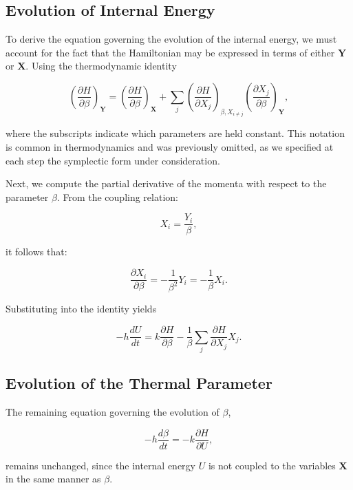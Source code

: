 \documentclass[12pt]{article}
\begin{document}
\subsection*{Evolution of Internal Energy}

To derive the equation governing the evolution of the internal energy, we must account for the fact that the Hamiltonian may be expressed in terms of either $\mathbf{Y}$ or $\mathbf{X}$. Using the thermodynamic identity

\begin{equation}
\left(\frac{\partial H}{\partial \beta} \right)_{\mathbf{Y}} =  
\left(\frac{\partial H}{\partial \beta} \right)_{\mathbf{X}} + \sum_{j} \left(\frac{\partial H}{\partial X_{j}} \right)_{\beta, X_{i \neq j}} \left(\frac{\partial X_{j}}{\partial \beta} \right)_{\mathbf{Y}},
\end{equation}
 
where the subscripts indicate which parameters are held constant. This notation is common in thermodynamics and was previously omitted, as we specified at each step the symplectic form under consideration.

Next, we compute the partial derivative of the momenta with respect to the parameter $\beta$.  From the coupling relation:

\begin{equation}
X_{i}  = \frac{Y_{i}}{\beta},
\end{equation}

it follows that:

\begin{equation}
\frac{\partial X_{i}}{\partial \beta} = -\frac{1}{\beta^2} Y_{i} = -\frac{1}{\beta} X_{i}.
\end{equation}

Substituting into the identity yields

\begin{equation}
-h\frac{dU}{dt} = k\frac{\partial H}{\partial \beta} - \frac{1}{\beta} \sum_{j} \frac{\partial H}{\partial X_{j}}X_{j}.
\end{equation}

\subsection*{Evolution of the Thermal Parameter}

The remaining equation governing the evolution of $\beta$,

\begin{equation}
-h\frac{d\beta}{dt} = -k\frac{\partial H}{\partial U},
\end{equation}

remains unchanged, since the internal energy $U$ is not coupled to the variables $\mathbf{X}$ in the same manner as $\beta$.
\newpage


\end{document}
